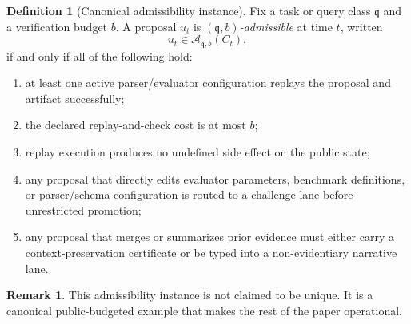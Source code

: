 \documentclass[11pt]{article}
\theoremstyle{definition}
\newtheorem{definition}[theorem]{Definition}
\newtheorem{remark}[theorem]{Remark}
\newcommand{\1}{\mathbf{1}}
\begin{document}
\begin{definition}[Canonical admissibility instance]\label{def:admissibility}
Fix a task or query class $\mathfrak q$ and a verification budget $b$. A proposal $u_t$ is \emph{$(\mathfrak q,b)$-admissible} at time $t$, written
\[
u_t\in\mathcal A_{\mathfrak q,b}(C_t),
\]
if and only if all of the following hold:
\begin{enumerate}[label=(\roman*), leftmargin=2em]
  \item at least one active parser/evaluator configuration replays the proposal and artifact successfully;
  \item the declared replay-and-check cost is at most $b$;
  \item replay execution produces no undefined side effect on the public state;
  \item any proposal that directly edits evaluator parameters, benchmark definitions, or parser/schema configuration is routed to a challenge lane before unrestricted promotion;
  \item any proposal that merges or summarizes prior evidence must either carry a context-preservation certificate or be typed into a non-evidentiary narrative lane.
\end{enumerate}
\end{definition}

\begin{remark}
This admissibility instance is not claimed to be unique. It is a canonical public-budgeted example that makes the rest of the paper operational.
\end{remark}
\end{document}

